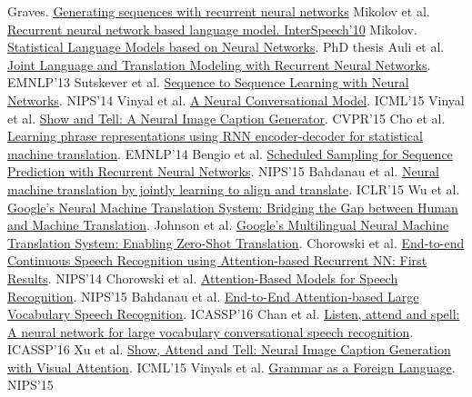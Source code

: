 \documentclass[10pt,a4paper]{ctexbook}
\begin{document}
\begin{itemize}
\subitem Graves. \href{https://arxiv.org/abs/1308.0850}{Generating sequences with recurrent neural networks}
\subitem Mikolov et al. \href{http://isca-speech.org/archive/archive_papers/interspeech_2010/i10_1045.pdf}{Recurrent neural network based language model. InterSpeech’10}
\subitem Mikolov. \href{http://deeplearning.cs.cmu.edu/pdfs/1030/Mikolov_Thesis.pdf}{Statistical Language Models based on Neural Networks}. PhD thesis 
\subitem Auli et al. \href{https://www.microsoft.com/en-us/research/wp-content/uploads/2016/02/EMNLP2013RNNMT.pdf}{Joint Language and Translation Modeling with Recurrent Neural Networks}. EMNLP’13
\subitem Sutskever et al. \href{https://arxiv.org/abs/1409.3215}{Sequence to Sequence Learning with Neural Networks}. NIPS’14 
\subitem Vinyal et al. \href{https://arxiv.org/abs/1506.05869}{A Neural Conversational Model}. ICML’15 
\subitem Vinyal et al. \href{https://arxiv.org/abs/1411.4555}{Show and Tell: A Neural Image Caption Generator}. CVPR’15 
\subitem Cho et al. \href{https://arxiv.org/abs/1406.1078}{Learning phrase representations using RNN encoder-decoder for statistical machine translation}. EMNLP’14 
\subitem Bengio et al. \href{https://arxiv.org/abs/1506.03099}{Scheduled Sampling for Sequence Prediction with Recurrent Neural Networks}. NIPS’15 
\subitem Bahdanau et al. \href{https://arxiv.org/abs/1409.0473}{Neural machine translation by jointly learning to align and translate}. ICLR’15 
\subitem Wu et al. \href{https://arxiv.org/abs/1609.08144}{Google’s Neural Machine Translation System: Bridging the Gap between Human and Machine Translation}. 
\subitem Johnson et al. \href{https://arxiv.org/abs/1611.04558}{Google’s Multilingual Neural Machine Translation System: Enabling Zero-Shot Translation}.
\subitem Chorowski et al. \href{https://arxiv.org/abs/1412.1602}{End-to-end Continuous Speech Recognition using Attention-based Recurrent NN: First Results}. NIPS’14 
\subitem Chorowski et al. \href{https://arxiv.org/abs/1506.07503}{Attention-Based Models for Speech Recognition}. NIPS’15 
\subitem Bahdanau et al. \href{https://arxiv.org/abs/1508.04395}{End-to-End Attention-based Large Vocabulary Speech Recognition}. ICASSP’16
\subitem Chan et al. \href{http://mirlab.org/conference_papers/International_Conference/ICASSP\%202016/pdfs/0004960.pdf}{Listen, attend and spell: A neural network for large vocabulary conversational speech recognition}. ICASSP’16 
\subitem Xu et al. \href{https://arxiv.org/abs/1502.03044}{Show, Attend and Tell: Neural Image Caption Generation with Visual Attention}. ICML’15 
\subitem Vinyals et al. \href{https://arxiv.org/abs/1412.7449}{Grammar as a Foreign Language}. NIPS’15 

\end{itemize}
\end{document}
